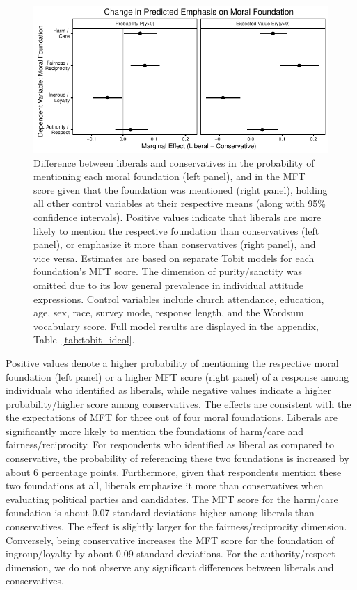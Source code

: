 \documentclass[12pt]{article}
\begin{document}
\begin{figure}[ht]\centering
\includegraphics{../calc/fig/tobit_ideol.pdf}
\caption{Difference between liberals and conservatives in the probability of mentioning each moral foundation (left panel), and in the MFT score given that the foundation was mentioned (right panel), holding all other control variables at their respective means (along with 95\% confidence intervals). Positive values indicate that liberals are more likely to mention the respective foundation than conservatives (left panel), or emphasize it more than conservatives (right panel), and vice versa. Estimates are based on separate Tobit models for each foundation's MFT score. The dimension of purity/sanctity was omitted due to its low general prevalence in individual attitude expressions. Control variables include church attendance, education, age, sex, race, survey mode, response length, and the Wordsum vocabulary score. Full model results are displayed in the appendix, Table~\ref{tab:tobit_ideol}.
}\label{fig:tobit_ideol}
\end{figure}

Positive values denote a higher probability of mentioning the respective moral foundation (left panel) or a higher MFT score (right panel) of a response among individuals who identified as liberals, while negative values indicate a higher probability/higher score among conservatives. The effects are consistent with the the expectations of MFT for three out of four moral foundations. Liberals are significantly more likely to mention the foundations of harm/care and fairness/reciprocity. For respondents who identified as liberal as compared to conservative, the probability of referencing these two foundations is increased by about 6 percentage points. Furthermore, given that respondents mention these two foundations at all, liberals emphasize it more than conservatives when evaluating political parties and candidates. The MFT score for the harm/care foundation is about 0.07 standard deviations higher among liberals than conservatives. The effect is slightly larger for the fairness/reciprocity dimension. Conversely, being conservative increases the MFT score for the foundation of ingroup/loyalty by about 0.09 standard deviations. For the authority/respect dimension, we do not observe any significant differences between liberals and conservatives.
\end{document}
